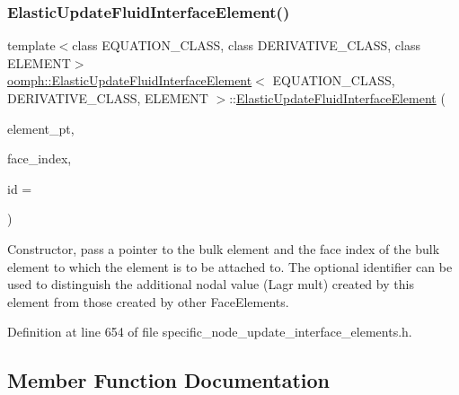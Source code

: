 \subsubsection{\texorpdfstring{Elastic\+Update\+Fluid\+Interface\+Element()}{ElasticUpdateFluidInterfaceElement()}}
{\footnotesize\ttfamily template$<$class E\+Q\+U\+A\+T\+I\+O\+N\+\_\+\+C\+L\+A\+SS, class D\+E\+R\+I\+V\+A\+T\+I\+V\+E\+\_\+\+C\+L\+A\+SS, class E\+L\+E\+M\+E\+NT$>$ \\
\hyperlink{classoomph_1_1ElasticUpdateFluidInterfaceElement}{oomph\+::\+Elastic\+Update\+Fluid\+Interface\+Element}$<$ E\+Q\+U\+A\+T\+I\+O\+N\+\_\+\+C\+L\+A\+SS, D\+E\+R\+I\+V\+A\+T\+I\+V\+E\+\_\+\+C\+L\+A\+SS, E\+L\+E\+M\+E\+NT $>$\+::\hyperlink{classoomph_1_1ElasticUpdateFluidInterfaceElement}{Elastic\+Update\+Fluid\+Interface\+Element} (\begin{DoxyParamCaption}\item[{\hyperlink{classoomph_1_1FiniteElement}{Finite\+Element} $\ast$const \&}]{element\+\_\+pt,  }\item[{const int \&}]{face\+\_\+index,  }\item[{const unsigned \&}]{id = {} }\end{DoxyParamCaption})\hspace{0.3cm}{\ttfamily [inline]}}



Constructor, pass a pointer to the bulk element and the face index of the bulk element to which the element is to be attached to. The optional identifier can be used to distinguish the additional nodal value (Lagr mult) created by this element from those created by other Face\+Elements. 



Definition at line 654 of file specific\+\_\+node\+\_\+update\+\_\+interface\+\_\+elements.\+h.



\subsection{Member Function Documentation}
\mbox{\label{classoomph_1_1ElasticUpdateFluidInterfaceElement_a15c3d2912325ace17676366c1469121f}} 
